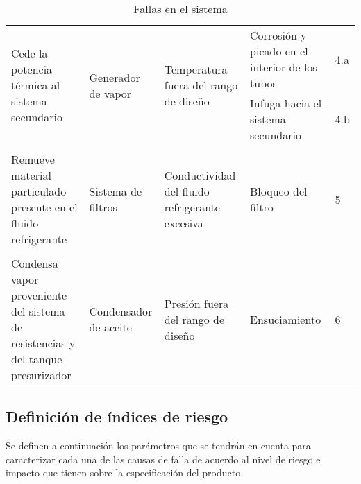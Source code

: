 \documentclass{article}
\begin{document}
\begin{table}[H]
\begin{tabularx}{\textwidth}{XXXXX}
\multirow{2}{7em}{Cede la potencia térmica al sistema secundario} & \multirow{2}{7em}{Generador de vapor} & \multirow{2}{7em}{Temperatura fuera del rango de diseño} & Corrosión y picado en el interior de los tubos & 4.a \\
 & & & Infuga hacia el sistema secundario &  4.b \\ \\
Remueve material particulado presente en el fluido refrigerante & Sistema de filtros & Conductividad del fluido refrigerante excesiva & Bloqueo del filtro & 5 \\ \\
Condensa vapor proveniente del sistema de resistencias y del tanque presurizador & Condensador de aceite & Presión fuera del rango de diseño & Ensuciamiento & 6 \\
\end{tabularx}
\caption{Fallas en el sistema}
\end{table}
\newpage
\subsection{Definición de índices de riesgo}
Se definen a continuación los parámetros que se tendrán en cuenta para caracterizar cada una de las causas de falla de acuerdo al nivel de riesgo e impacto que tienen sobre la especificación del producto.
\end{document}
